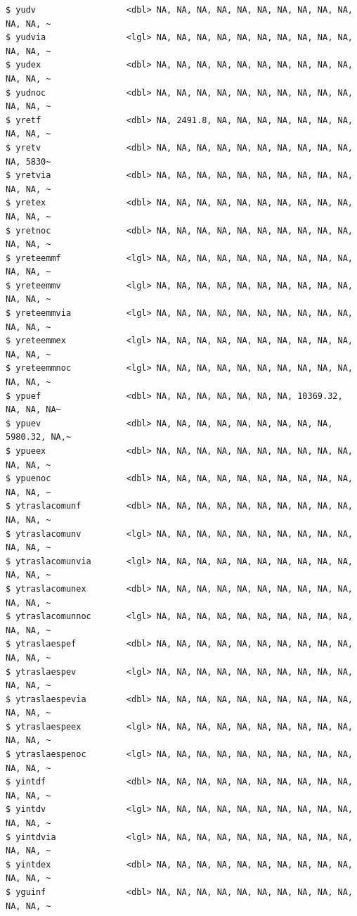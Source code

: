 \documentclass[
  letterpaper,
  DIV=11,
  numbers=noendperiod]{scrreprt}
\begin{document}
\begin{verbatim}
$ yudv                  <dbl> NA, NA, NA, NA, NA, NA, NA, NA, NA, NA, NA, NA, ~
$ yudvia                <lgl> NA, NA, NA, NA, NA, NA, NA, NA, NA, NA, NA, NA, ~
$ yudex                 <dbl> NA, NA, NA, NA, NA, NA, NA, NA, NA, NA, NA, NA, ~
$ yudnoc                <dbl> NA, NA, NA, NA, NA, NA, NA, NA, NA, NA, NA, NA, ~
$ yretf                 <dbl> NA, 2491.8, NA, NA, NA, NA, NA, NA, NA, NA, NA, ~
$ yretv                 <dbl> NA, NA, NA, NA, NA, NA, NA, NA, NA, NA, NA, 5830~
$ yretvia               <dbl> NA, NA, NA, NA, NA, NA, NA, NA, NA, NA, NA, NA, ~
$ yretex                <dbl> NA, NA, NA, NA, NA, NA, NA, NA, NA, NA, NA, NA, ~
$ yretnoc               <dbl> NA, NA, NA, NA, NA, NA, NA, NA, NA, NA, NA, NA, ~
$ yreteemmf             <lgl> NA, NA, NA, NA, NA, NA, NA, NA, NA, NA, NA, NA, ~
$ yreteemmv             <lgl> NA, NA, NA, NA, NA, NA, NA, NA, NA, NA, NA, NA, ~
$ yreteemmvia           <lgl> NA, NA, NA, NA, NA, NA, NA, NA, NA, NA, NA, NA, ~
$ yreteemmex            <lgl> NA, NA, NA, NA, NA, NA, NA, NA, NA, NA, NA, NA, ~
$ yreteemmnoc           <lgl> NA, NA, NA, NA, NA, NA, NA, NA, NA, NA, NA, NA, ~
$ ypuef                 <dbl> NA, NA, NA, NA, NA, NA, NA, 10369.32, NA, NA, NA~
$ ypuev                 <dbl> NA, NA, NA, NA, NA, NA, NA, NA, NA, 5980.32, NA,~
$ ypueex                <dbl> NA, NA, NA, NA, NA, NA, NA, NA, NA, NA, NA, NA, ~
$ ypuenoc               <dbl> NA, NA, NA, NA, NA, NA, NA, NA, NA, NA, NA, NA, ~
$ ytraslacomunf         <dbl> NA, NA, NA, NA, NA, NA, NA, NA, NA, NA, NA, NA, ~
$ ytraslacomunv         <lgl> NA, NA, NA, NA, NA, NA, NA, NA, NA, NA, NA, NA, ~
$ ytraslacomunvia       <lgl> NA, NA, NA, NA, NA, NA, NA, NA, NA, NA, NA, NA, ~
$ ytraslacomunex        <dbl> NA, NA, NA, NA, NA, NA, NA, NA, NA, NA, NA, NA, ~
$ ytraslacomunnoc       <lgl> NA, NA, NA, NA, NA, NA, NA, NA, NA, NA, NA, NA, ~
$ ytraslaespef          <dbl> NA, NA, NA, NA, NA, NA, NA, NA, NA, NA, NA, NA, ~
$ ytraslaespev          <lgl> NA, NA, NA, NA, NA, NA, NA, NA, NA, NA, NA, NA, ~
$ ytraslaespevia        <dbl> NA, NA, NA, NA, NA, NA, NA, NA, NA, NA, NA, NA, ~
$ ytraslaespeex         <lgl> NA, NA, NA, NA, NA, NA, NA, NA, NA, NA, NA, NA, ~
$ ytraslaespenoc        <lgl> NA, NA, NA, NA, NA, NA, NA, NA, NA, NA, NA, NA, ~
$ yintdf                <dbl> NA, NA, NA, NA, NA, NA, NA, NA, NA, NA, NA, NA, ~
$ yintdv                <lgl> NA, NA, NA, NA, NA, NA, NA, NA, NA, NA, NA, NA, ~
$ yintdvia              <lgl> NA, NA, NA, NA, NA, NA, NA, NA, NA, NA, NA, NA, ~
$ yintdex               <dbl> NA, NA, NA, NA, NA, NA, NA, NA, NA, NA, NA, NA, ~
$ yguinf                <dbl> NA, NA, NA, NA, NA, NA, NA, NA, NA, NA, NA, NA, ~

\end{verbatim}
\end{document}
